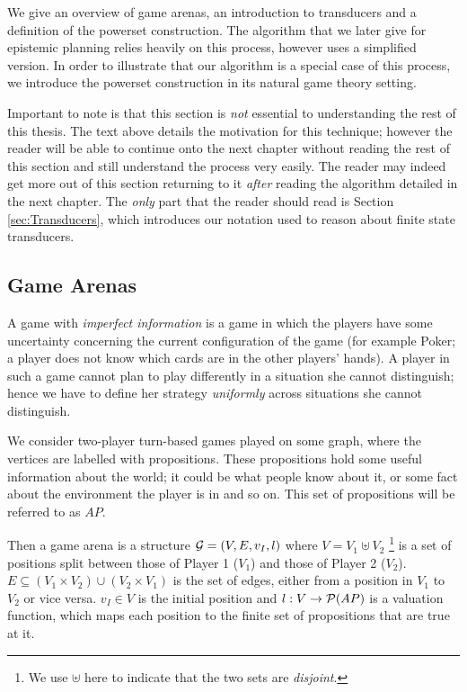 \documentclass[10pt, a4paper]{report}
\begin{document}
We give an overview of game arenas, an introduction to transducers and
a definition of the powerset construction. The algorithm that we later give for
epistemic planning relies heavily on this process, however uses a simplified
version. In order to illustrate that our algorithm is a special case of this
process, we introduce the powerset construction in its natural game theory
setting. 

Important to note is that this section is \emph{not} essential to understanding
the rest of this thesis. The text above details the motivation for this
technique; however the reader will be able to continue onto the next chapter
without reading the rest of this section and still understand the process very
easily. The reader may indeed get more out of this section returning to it
\emph{after} reading the algorithm detailed in the next chapter. The \emph{only}
part that the reader should read is Section \ref{sec:Transducers}, which
introduces our notation used to reason about finite state transducers.

\subsection{Game Arenas}

A game with \emph{imperfect information} is a game in which the players have
some uncertainty concerning the current configuration of the game (for example
Poker; a player does not know which cards are in the other players' hands). A
player in such a game cannot plan to play differently in a situation she cannot
distinguish; hence we have to define her strategy \emph{uniformly} across
situations she cannot distinguish. 

We consider two-player turn-based games played on some graph, where the
vertices are labelled with propositions. These propositions hold some useful
information about the world; it could be what people know about it, or some fact
about the environment the player is in and so on. This set of propositions will
be referred to as $AP$. 

Then a game arena is a structure $\mathcal{G} = (V, E, v_I, l)$ where $V = V_1 \uplus
V_2$ \footnote{We use $\uplus$ here to indicate that the two sets are
  \emph{disjoint}.} is a set of positions split between those of Player 1
($V_1$) and those of Player 2 ($V_2$). $E \subseteq (V_1 \times V_2) \cup (V_2
\times V_1)$ is the set of edges, either from a position in $V_1$ to $V_2$ or
vice versa. $v_I \in V$ is the initial position and $l : V \rightarrow
\mathcal{P}(AP)$ is a valuation function, which maps each position to the finite set
of propositions that are true at it.
\end{document}
